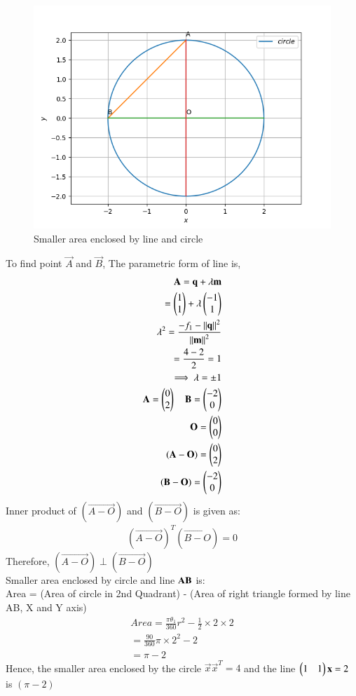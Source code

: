 \documentclass[journal,12pt,twocolumn]{IEEEtran}
\begin{document}
\begin{figure}[h!]
	\centering
	\includegraphics[width=\columnwidth]{circle.png}
	\caption{Smaller area enclosed by line and circle}
	\label{eq:myfig}
\end{figure}

To find point $\vec{A}$ and $\vec{B}$,
The parametric form of line is,
\begin{align}
    \mathbf{A} = \mathbf{q}+\lambda\mathbf{m}\label{eq9}\\
            = \begin{pmatrix}1\\1\end{pmatrix}+\lambda\begin{pmatrix}-1\\1\end{pmatrix}\label{eq10}\\
    \lambda^2 = \frac{-f_1-\left\lVert\mathbf{q}\right\rVert^2}{\left\lVert\mathbf{m}\right\rVert^2}\label{eq11}\\
                = \frac{4-2}{2} = 1\label{eq12}\\
    \implies \lambda = \pm{1} \label{eq13}\\
    \mathbf{A} = \begin{pmatrix}0\\2\end{pmatrix}\quad \mathbf{B} = \begin{pmatrix}-2\\0\end{pmatrix}\label{eq14}\\
    \mathbf{O} = \begin{pmatrix}0\\0\end{pmatrix} \\
    (\mathbf{A-O}) = \begin{pmatrix}0\\2\end{pmatrix}\\
    (\mathbf{B-O}) = \begin{pmatrix}-2\\0\end{pmatrix}
\end{align}
Inner product of $(\vec{A-O})$ and $(\vec{B-O})$ is given as:
\begin{align}
(\vec{A-O})^T(\vec{B-O})=0
\end{align}
Therefore, $(\vec{A-O}) \perp (\vec{B-O})$ \\
Smaller area enclosed by circle and line $\bf{AB}$ is:\\
 Area = (Area of circle in 2nd Quadrant) - (Area of right triangle formed by line AB, X and Y axis)
 \begin{align}
Area=\frac{\pi\theta_1}{360}r^2-\frac{1}{2}\times2\times2\label{eq15}\\
=\frac{90}{360}\pi\times2^2-2\label{eq16}\\
=\pi-2\label{eq17}
\end{align}
Hence, the smaller area enclosed by the circle  $\vec{x}\vec{x}^T=4$ and the line $\begin{pmatrix}1 & 1\end{pmatrix} \mathbf{x}=2$ is $(\pi-2)$
\end{document}
